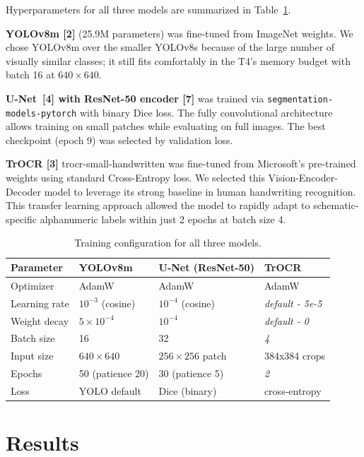 \documentclass{article}
\begin{document}
Hyperparameters for all three models are summarized in Table~\ref{tab:hp}. 

\textbf{YOLOv8m [2]} (25.9M parameters) was fine-tuned from ImageNet
weights. We chose YOLOv8m over the smaller YOLOv8s because of the large
number of visually similar classes; it still fits comfortably in the
T4's memory budget with batch 16 at $640{\times}640$.

\textbf{U-Net~[4] with ResNet-50 encoder [7]} was trained via
\texttt{segmentation-models-pytorch} with binary Dice loss. The fully
convolutional architecture allows training on small patches while
evaluating on full images. The best checkpoint (epoch 9) was selected
by validation loss.

\textbf{TrOCR [3]} trocr-small-handwritten was fine-tuned from Microsoft’s pre-trained weights using standard Cross-Entropy loss. We selected this Vision-Encoder-Decoder model to leverage its strong baseline in human handwriting recognition. This transfer learning approach allowed the model to rapidly adapt to schematic-specific alphanumeric labels within just 2 epochs at batch size 4.  

\begin{table}[H]
\caption{Training configuration for all three models.}
\label{tab:hp}
\centering
\small
\begin{tabular}{llll}
\toprule
Parameter & YOLOv8m & U-Net (ResNet-50) & TrOCR \\
\midrule
Optimizer       & AdamW                 & AdamW                 & AdamW \\
Learning rate   & $10^{-3}$ (cosine)    & $10^{-4}$ (cosine)    & \textit{default - 5e-5 } \\
Weight decay    & $5\!\times\!10^{-4}$  & $10^{-4}$             & \textit{default - 0} \\
Batch size      & 16                    & 32                    & \textit{4} \\
Input size      & $640{\times}640$      & $256{\times}256$ patch & 384x384 crops \\
Epochs          & 50 (patience 20)      & 30 (patience 5)       & \textit{2} \\
Loss            & YOLO default          & Dice (binary)         & cross-entropy \\\bottomrule
\end{tabular}
\end{table}
\section{Results}
\label{sec:results}
\end{document}
